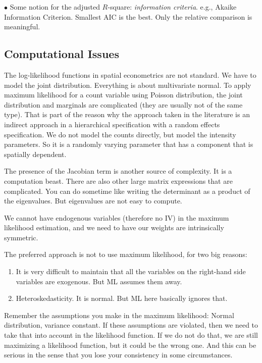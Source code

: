 \documentclass[11pt,a4paper]{amsart}
\theoremstyle{plain}
\theoremstyle{definition}
\begin{document}
$\bullet$ Some notion for the adjusted $R$-square: \textit{information criteria}. e.g., Akaike Information Criterion. Smallest AIC is the best. Only the relative comparison is meaningful. 

\subsection{Computational Issues}\hfill\par 
The log-likelihood functions in spatial econometrics are not standard. We have to model the joint distribution. Everything is about multivariate normal. To apply maximum likelihood for a count variable using Poisson distribution, the joint distribution and marginals are complicated (they are usually not of the same type). That is part of the reason why the approach taken in the literature is an indirect approach in a hierarchical specification  with a random effects specification. We do not model the counts directly, but model the intensity parameters. So it is a randomly varying parameter that has a component that is spatially dependent. 

The presence of the Jacobian term is another source of complexity. It is a computation beast. There are also other large matrix expressions that are complicated. You can do sometime like writing the determinant as a product of the eigenvalues. But eigenvalues are not easy to compute.  

We cannot have endogenous variables (therefore no IV) in the maximum likelihood estimation, and we need to have our weights are intrinsically symmetric. 

The preferred approach is not to use maximum likelihood, for two big reasons:
\begin{enumerate}
	\item It is very difficult to maintain that all the variables on the right-hand side variables are exogenous. But ML assumes them away.
	\item Heteroskedasticity. It is normal. But ML here basically ignores that.
\end{enumerate}

Remember the assumptions you make in the maximum likelihood: Normal distribution, variance constant. If these assumptions are violated, then we need to take that into account in the likelihood function. If we do not do that, we are still maximizing a likelihood function, but it could be the wrong one. And this can be serious in the sense that you lose your consistency in some circumstances.
\printbibliography %
		
\end{document}
